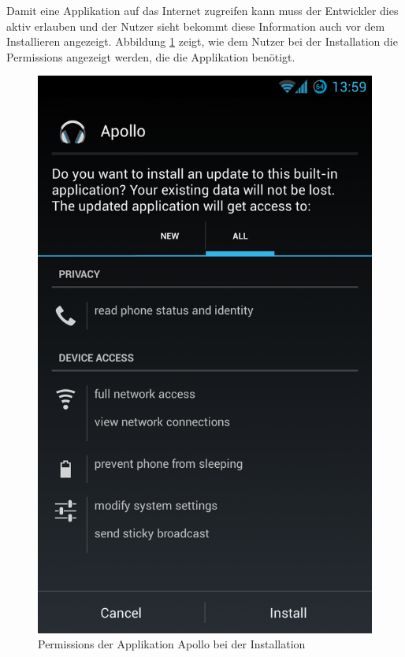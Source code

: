 Damit eine Applikation auf das Internet zugreifen kann muss der Entwickler dies aktiv erlauben und der Nutzer sieht bekommt diese Information auch vor dem Installieren angezeigt. Abbildung \ref{permissions} zeigt, wie dem Nutzer bei der Installation die Permissions angezeigt werden, die die Applikation benötigt. 

\begin{figure}[ht!]
\begin{center}
\includegraphics[scale=0.3]{images/permissions}
\caption{Permissions der Applikation Apollo bei der Installation}
\label{permissions}
\end{center}
\end{figure}

